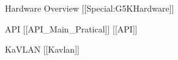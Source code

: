 \documentclass[final]{beamer}
\newlength{\sepwid}
\newlength{\onecolwid}
\newlength{\twocolwid}
\begin{document}
\begin{frame}[t]
\begin{columns}[t]
\begin{column}{\twocolwid} %



\begin{alertblock}{Hardware Overview [[Special:G5KHardware]]}

\end{alertblock}



\begin{alertblock}{API [[API\_Main\_Pratical]] [[API]]}

\end{alertblock}



\begin{alertblock}{KaVLAN [[Kavlan]]}

\end{alertblock}


\end{column} %

\begin{column}{\sepwid}\end{column} %

\begin{column}{\onecolwid} %



\end{column}
\end{columns}
\end{frame}
\end{document}
